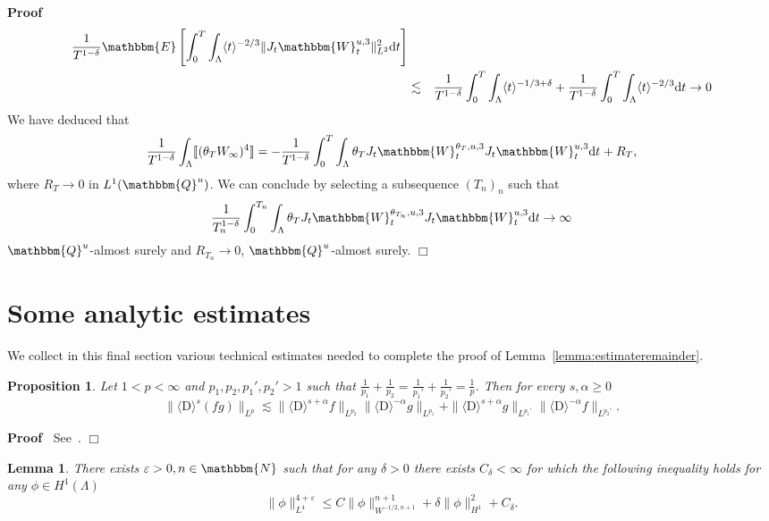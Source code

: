 \documentclass[11pt]{article}
\newcommand{\mathD}{\mathrm{D}}
\newcommand{\mathd}{\mathrm{d}}
\newenvironment{proof}{\noindent\textbf{Proof\ }}{\hspace*{\fill}$\Box$\medskip}
\newtheorem{lemma}{Lemma}
\newtheorem{proposition}{Proposition}
{\theorembodyfont{\rmfamily}\newtheorem{remark}{Remark}}
\begin{document}
\begin{proof}
\begin{eqnarray*}
    \frac{1}{T^{1 - \delta}} \mathbbm{E} \left[ \int^T_0 \int_{\Lambda}
    \langle t \rangle^{- 2 / 3} \| J_t \mathbbm{W}_t^{u, 3} \|^2_{L^2} \mathd
    t \right]\\
    & \lesssim & \frac{1}{T^{1 - \delta}} \int^T_0 \int_{\Lambda} \langle t
    \rangle^{- 1 / 3 + \delta} + \frac{1}{T^{1 - \delta}} \int^T_0
    \int_{\Lambda} \langle t \rangle^{- 2 / 3} \mathd t \rightarrow 0
  \end{eqnarray*}
  We have deduced that
  \[ \frac{1}{T^{1 - \delta}} \int_{\Lambda} \llbracket (\theta_T
     W_{\infty})^4 \rrbracket = - \frac{1}{T^{1 - \delta}} \int^T_0
     \int_{\Lambda} \theta_T J_t \mathbbm{W}_t^{\theta_T, u, 3} J_t
     \mathbbm{W}_t^{u, 3} \mathd t_{} + R_T, \]
  where $R_T \rightarrow 0$ in $L^1 (\mathbbm{Q}^u)$. We can conclude by
  selecting a subsequence $(T_n)_n$ such that
  \[ \frac{1}{T_n^{1 - \delta}} \int^{T_n}_0 \int_{\Lambda} \theta_T J_t
     \mathbbm{W}_t^{\theta_{T_n}, u, 3} J_t \mathbbm{W}_t^{u, 3} \mathd t
     \rightarrow \infty \]
  $\mathbbm{Q}^u$-almost surely and $R_{T_n} \rightarrow 0$,
  $\mathbbm{Q}^u$-almost surely.
\end{proof}

\section{Some analytic estimates }\label{sec:analytic}

We collect in this final section various technical estimates needed to
complete the proof of Lemma~\ref{lemma:estimateremainder}.

\begin{proposition}
  \label{FractionalLeibniz}Let $1 < p < \infty$ and $p_1, p_2, p_1', p_2' > 1$
  such that $\frac{1}{p_1} + \frac{1}{p_2} = \frac{1}{p_1'} + \frac{1}{p_2'} =
  \frac{1}{p}$. Then for every $s, \alpha \geqslant 0$ \
  \[ \| \langle \mathD \rangle^s (f g) \|_{L^p} \lesssim \| \langle \mathD
     \rangle^{s + \alpha} f \|_{L^{p_2}}  \| \langle \mathD \rangle^{- \alpha}
     g \|_{L^{p_1}} + \| \langle \mathD \rangle^{s + \alpha} g \|_{L^{p_1'}} 
     \| \langle \mathD \rangle^{- \alpha} f \|_{L^{p_2'}} . \]
\end{proposition}

\begin{proof}
  See~{\cite{gulisashvili_exact_1996}}.
\end{proof}

\begin{lemma}
  There exists $\varepsilon > 0, n \in \mathbbm{N}$ such that for any $\delta
  > 0$ there exists $C_{\delta} < \infty$ for which the following inequality
  holds for any $\phi \in H^1 (\Lambda)$ \label{L4estimate}
  \[ \| \phi \|^{4 + \varepsilon}_{L^4} \leqslant C \| \phi \|^{n + 1}_{W^{- 1
     / 2, n + 1}} + \delta \| \phi \|^2_{H^1} + C_{\delta} . \]
\end{lemma}
\end{document}

